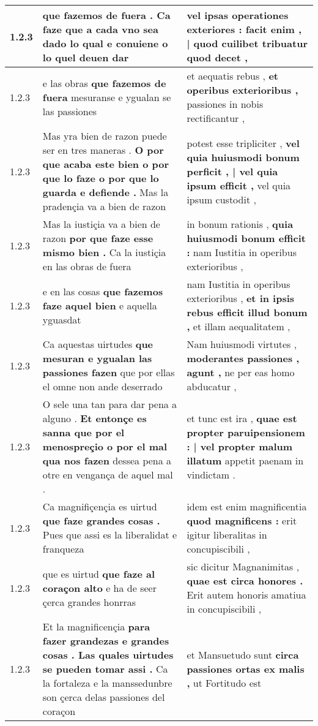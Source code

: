 \begin{tabular}{|p{1cm}|p{6.5cm}|p{6.5cm}|}
1.2.3 & que fazemos de fuera . \textbf{ Ca faze que a cada vno sea dado lo qual e conuiene } o lo quel deuen dar & vel ipsas operationes exteriores : \textbf{ facit enim , | quod cuilibet tribuatur } quod decet , \\\hline
1.2.3 & e las obras \textbf{ que fazemos de fuera } mesuranse e ygualan se las passiones & et aequatis rebus , \textbf{ et operibus exterioribus , } passiones in nobis rectificantur , \\\hline
1.2.3 & Mas yra bien de razon puede ser en tres maneras . \textbf{ O por que acaba este bien o por que lo faze o por que lo guarda e defiende . } Mas la pradençia va a bien de razon & potest esse tripliciter , \textbf{ vel quia huiusmodi bonum perficit , | vel quia ipsum efficit , } vel quia ipsum custodit , \\\hline
1.2.3 & Mas la iustiçia va a bien de razon \textbf{ por que faze esse mismo bien . } Ca la iustiçia en las obras de fuera & in bonum rationis , \textbf{ quia huiusmodi bonum efficit : } nam Iustitia in operibus exterioribus , \\\hline
1.2.3 & e en las cosas \textbf{ que fazemos faze aquel bien } e aquella yguasdat & nam Iustitia in operibus exterioribus , \textbf{ et in ipsis rebus efficit illud bonum , } et illam aequalitatem , \\\hline
1.2.3 & Ca aquestas uirtudes \textbf{ que mesuran e ygualan las passiones fazen } que por ellas el omne non ande deserrado & Nam huiusmodi virtutes , \textbf{ moderantes passiones , agunt , } ne per eas homo abducatur , \\\hline
1.2.3 & O sele una tan para dar pena a alguno . \textbf{ Et entonçe es sanna que por el menospreçio o por el mal qua nos fazen } dessea pena a otre en vengança de aquel mal . & et tunc est ira , \textbf{ quae est propter paruipensionem : | vel propter malum illatum } appetit paenam in vindictam . \\\hline
1.2.3 & Ca magnifiçençia es uirtud \textbf{ que faze grandes cosas . } Pues que assi es la liberalidat e franqueza & idem est enim magnificentia \textbf{ quod magnificens : } erit igitur liberalitas in concupiscibili , \\\hline
1.2.3 & que es uirtud \textbf{ que faze al coraçon alto } e ha de seer çerca grandes honrras & sic dicitur Magnanimitas , \textbf{ quae est circa honores . } Erit autem honoris amatiua in concupiscibili , \\\hline
1.2.3 & Et la magnificençia \textbf{ para fazer grandezas e grandes cosas . Las quales uirtudes se pueden tomar assi . } Ca la fortaleza e la manssedunbre son çerca delas passiones del coraçon & et Mansuetudo sunt \textbf{ circa passiones ortas ex malis , } ut Fortitudo est \\\hline

\end{tabular}
